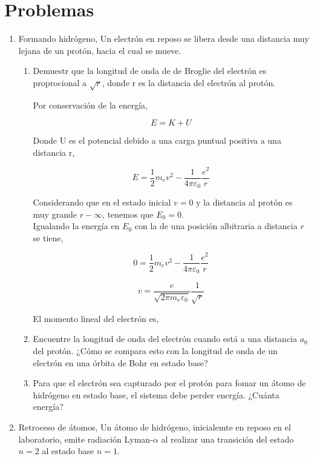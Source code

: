 \documentclass[12pt,a4paper]{article}
\begin{document}
\section{Problemas}

\begin{enumerate}

\item Formando hidrógeno, Un electrón en reposo se libera desde una distancia muy lejana de un protón, hacia el cual se mueve.

\begin{enumerate}

\item Demuestr que la longitud de onda de de Broglie del electrón es proprocional a $\sqrt r$, donde r es la distancia del electrón al protón.

Por conservación de la energía, 

$$ E = K + U $$

Donde U es el potencial debido a una carga puntual positiva a una distancia r,

$$ E = \frac12 m_e v^2 - \frac1{4\pi\varepsilon_0} \frac{e^2}r $$

Considerando que en el estado inicial $v = 0$ y la distancia al protón es muy grande $r - \infty$, tenemos que $E_0 = 0$.\\

Igualando la energía en $E_0$ con la de una posición albitraria a distancia $r$ se tiene, 

$$ 0 = \frac12 m_e v^2 - \frac1{4\pi\varepsilon_0} \frac{e^2}r $$

$$ v = \frac{e}{\sqrt{2\pi m_e\varepsilon_0}} \frac{1}{\sqrt{r}} $$

El momento lineal del electrón es, 



\item Encuentre la longitud de onda del electrón cuando está a una distancia $a_0$ del protón. ¿Cómo se compara esto con la longitud de onda de un electrón en una órbita de Bohr en estado base?

\item Para que el electrón sea capturado por el protón para fomar un átomo de hidrógeno en estado base, el sistema debe perder energía. ¿Cuánta energía?

\end{enumerate}

\item Retroceso de átomos, Un átomo de hidrógeno, inicialemte en reposo en el laboratorio, emite radiación Lyman-$\alpha$ al realizar una transición del estado $n =2$ al estado base $n = 1$.


\end{enumerate}
\end{document}

